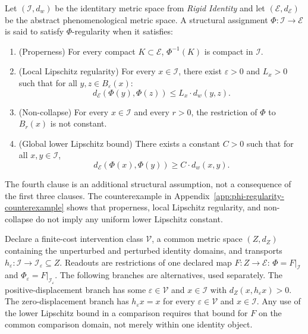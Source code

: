 \begin{hypothesis}\label{hyp:phi-regularity}
Let $(\mathcal{I}, d_w)$ be the identitary metric space from \textit{Rigid Identity} and let $(\mathcal{E}, d_\mathcal{E})$ be the abstract phenomenological metric space. A structural assignment $\Phi: \mathcal{I} \to \mathcal{E}$ is said to satisfy $\Phi$-regularity when it satisfies:
\begin{enumerate}[leftmargin=*]
    \item (Properness) For every compact $K \subset \mathcal{E}$, $\Phi^{-1}(K)$ is compact in $\mathcal{I}$.
    \item (Local Lipschitz regularity) For every $x \in \mathcal{I}$, there exist $\varepsilon > 0$ and $L_x > 0$ such that for all $y, z \in B_\varepsilon(x)$:
    \begin{equation}
        d_\mathcal{E}(\Phi(y), \Phi(z)) \leq L_x \cdot d_w(y, z).
    \end{equation}
    \item (Non-collapse) For every $x \in \mathcal{I}$ and every $r > 0$, the restriction of $\Phi$ to $B_r(x)$ is not constant.
    \item (Global lower Lipschitz bound) There exists a constant $C>0$ such that for all $x,y\in\mathcal{I}$,
    \begin{equation}
        d_\mathcal{E}(\Phi(x),\Phi(y)) \geq C\cdot d_w(x,y).
    \end{equation}
\end{enumerate}
\end{hypothesis}

\begin{caveat}
The fourth clause is an additional structural assumption, not a consequence of the first three clauses. The counterexample in Appendix~\ref{app:phi-regularity-counterexample} shows that properness, local Lipschitz regularity, and non-collapse do not imply any uniform lower Lipschitz constant.
\end{caveat}

\begin{hypothesis}\label{hyp:audited-comparison}
Declare a finite-cost intervention class $\mathcal V$, a common metric space $(Z,d_Z)$ containing the unperturbed and perturbed identity domains, and transports $h_\varepsilon:\mathcal I\to\mathcal I_\varepsilon\subseteq Z$. Readouts are restrictions of one declared map $F:Z\to\mathcal E$: $\Phi=F|_{\mathcal I}$ and $\Phi_\varepsilon=F|_{\mathcal I_\varepsilon}$.
The following branches are alternatives, used separately. The positive-displacement branch has some $\varepsilon\in\mathcal V$ and $x\in\mathcal I$ with $d_Z(x,h_\varepsilon x)>0$. The zero-displacement branch has $h_\varepsilon x=x$ for every $\varepsilon\in\mathcal V$ and $x\in\mathcal I$. Any use of the lower Lipschitz bound in a comparison requires that bound for $F$ on the common comparison domain, not merely within one identity object.
\end{hypothesis}

